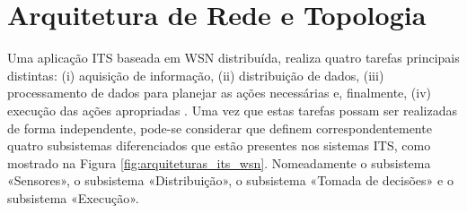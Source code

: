 \documentclass[
	12pt,				%
	oneside,			%
	a4paper,			%
	english,			%
	brazil				%
	]{abntex2ppgsi}
\begin{document}



\section{Arquitetura de Rede e Topologia}

Uma aplicação ITS baseada em WSN distribuída, realiza quatro tarefas principais distintas: (i) aquisição de informação, (ii) distribuição de dados, (iii) processamento de dados para planejar as ações necessárias e, finalmente, (iv) execução das ações apropriadas  \cite{losilla2011comprehensive}. Uma vez que estas tarefas possam ser realizadas de forma independente, pode-se considerar que definem correspondentemente quatro subsistemas diferenciados que estão presentes nos sistemas ITS, como mostrado na Figura \ref{fig:arquiteturas_its_wsn}. Nomeadamente o subsistema «Sensores», o subsistema «Distribuição», o subsistema «Tomada de decisões» e o subsistema «Execução». 
\end{document}
